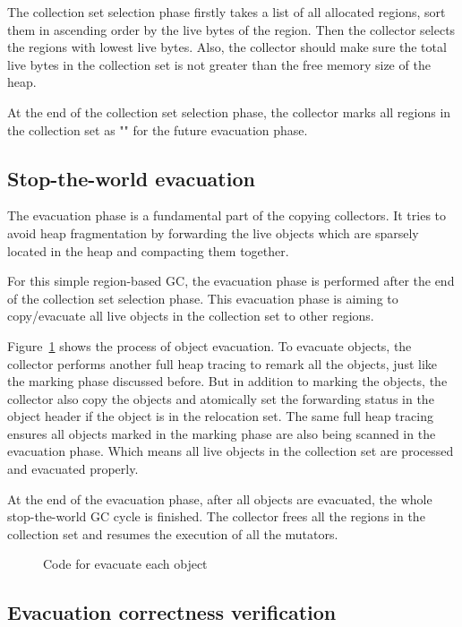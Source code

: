 The collection set selection phase firstly takes a list of all allocated regions,
sort them in ascending order by the live bytes of the region.
Then the collector selects the regions with lowest live bytes.
Also, the collector should make sure the total live bytes in the collection set is not
greater than the free memory size of the heap.

At the end of the collection set selection phase, the collector marks all regions
in the collection set as "" for the future evacuation phase.

\subsection{Stop-the-world evacuation}

The evacuation phase is a fundamental part of the copying collectors.
It tries to avoid heap fragmentation by forwarding the live objects which are sparsely located in the heap
and compacting them together.

For this simple region-based GC, the evacuation phase is performed after the end of the collection set selection phase.
This evacuation phase is aiming to copy/evacuate all live objects in the collection set to other
regions.

Figure~\ref{fig:traceevacuateobject} shows the process of object evacuation.
To evacuate objects, the collector performs another full heap tracing to remark all the objects,
just like the marking phase discussed before.
But in addition to marking the objects, the collector also copy the objects and atomically set the forwarding status in the object header
if the object is in the relocation set.
The same full heap tracing ensures all objects marked in the marking phase are also being scanned in the evacuation phase.
Which means all live objects in the collection set are processed and evacuated properly.

At the end of the evacuation phase, after all objects are evacuated, the whole stop-the-world GC cycle is finished.
The collector frees all the regions in the collection set and resumes the execution of all the mutators.

\begin{figure}
  \centering
  
  \caption{Code for evacuate each object}
  \label{fig:traceevacuateobject}
\end{figure}

\subsection{Evacuation correctness verification}

